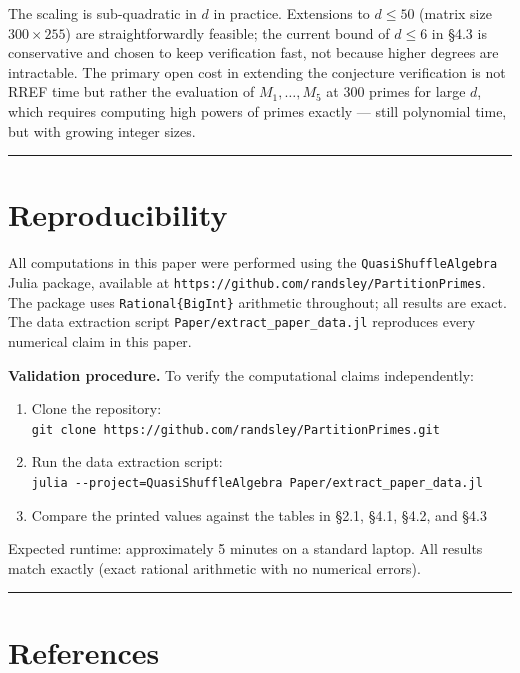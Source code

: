 \documentclass[
  11pt,
]{article}
\providecommand{\tightlist}{%
  \setlength{\itemsep}{0pt}\setlength{\parskip}{0pt}}
\begin{document}
The scaling is sub-quadratic in \(d\) in practice. Extensions to
\(d \leq 50\) (matrix size \(300 \times 255\)) are straightforwardly
feasible; the current bound of \(d \leq 6\) in §4.3 is conservative and
chosen to keep verification fast, not because higher degrees are
intractable. The primary open cost in extending the conjecture
verification is not RREF time but rather the evaluation of
\(M_1,\ldots,M_5\) at 300 primes for large \(d\), which requires
computing high powers of primes exactly --- still polynomial time, but
with growing integer sizes.

\begin{center}\rule{0.5\linewidth}{0.5pt}\end{center}

\section{Reproducibility}\label{reproducibility}

All computations in this paper were performed using the
\texttt{QuasiShuffleAlgebra} Julia package, available at
\texttt{https://github.com/randsley/PartitionPrimes}. The package uses
\texttt{Rational\{BigInt\}} arithmetic throughout; all results are
exact. The data extraction script \texttt{Paper/extract\_paper\_data.jl}
reproduces every numerical claim in this paper.

\textbf{Validation procedure.} To verify the computational claims
independently:

\begin{enumerate}
\def\labelenumi{\arabic{enumi}.}
\tightlist
\item
  Clone the repository:
  \texttt{git\ clone\ https://github.com/randsley/PartitionPrimes.git}
\item
  Run the data extraction script:\\
  \texttt{julia\ -\/-project=QuasiShuffleAlgebra\ Paper/extract\_paper\_data.jl}
\item
  Compare the printed values against the tables in §2.1, §4.1, §4.2, and
  §4.3
\end{enumerate}

Expected runtime: approximately 5 minutes on a standard laptop. All
results match exactly (exact rational arithmetic with no numerical
errors).

\begin{center}\rule{0.5\linewidth}{0.5pt}\end{center}

\section{References}\label{references}
\end{document}

